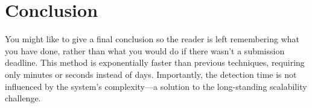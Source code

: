 \section{Conclusion}
You might like to give a final conclusion so the reader is left remembering what you have done, rather than what you would do if there wasn't a submission deadline.
This method is exponentially faster than previous techniques, requiring only minutes or seconds instead of days. Importantly, the detection time is not influenced by the system's complexity—a solution to the long-standing scalability challenge.
